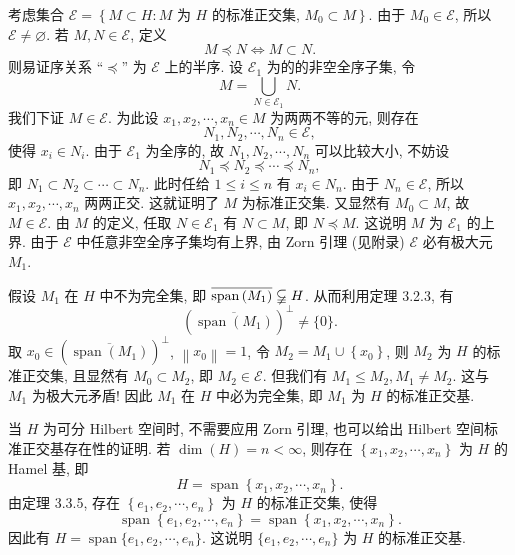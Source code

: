 \documentclass[openany]{ctexbook}
\makeatletter
\theoremstyle{kaiti}
\theoremstyle{normal}
\renewenvironment{proof}[1][\proofname]{\par
    \pushQED{\qed}%
    \normalfont \topsep6\p@\@plus6\p@\relax
    \trivlist
    \item\relax
    {\heiti #1}\hspace{2\labelsep}\ignorespaces
  }{%
    \popQED\endtrivlist\@endpefalse
  }
\makeatother
\begin{document}
\begin{proof}
考虑集合
$\mathcal{E}=\left\{M \subset H: M\right.$ 为 $H$ 的标准正交集, $\left.M_0 \subset M\right\}$.
由于 $M_0 \in \mathcal{E}$, 所以 $\mathcal{E} \neq \varnothing$.
若 $M, N \in \mathcal{E}$, 定义
$$
M \preccurlyeq N \Leftrightarrow M \subset N.
$$
则易证序关系 ``$\preccurlyeq$'' 为 $\mathcal{E}$ 上的半序. 设 $\mathcal{E}_1$ 为的的非空全序子集, 令
$$
M=\bigcup_{N \in \mathcal{E}_1} N.
$$
我们下证 $M \in \mathcal{E}$. 为此设 $x_1, x_2, \cdots, x_n \in M$ 为两两不等的元, 则存在
$$
N_1, N_2, \cdots, N_n \in \mathcal{E},
$$
使得 $x_{i} \in N_{i}$. 由于 $\mathcal{E}_1$ 为全序的, 故 $N_1, N_2, \cdots, N_n$ 可以比较大小, 不妨设
$$
N_1 \preccurlyeq N_2 \preccurlyeq \cdots \preccurlyeq N_n,
$$
即 $N_1 \subset N_2 \subset \cdots \subset N_n$. 此时任给 $1 \leqslant i \leqslant n$ 有 $x_{i} \in N_n$. 由于 $N_n \in \mathcal{E}$, 所以 $x_1, x_2, \cdots, x_n$ 两两正交. 这就证明了 $M$ 为标准正交集. 又显然有 $M_0 \subset M$, 故 $M \in \mathcal{E}$. 由 $M$ 的定义, 任取 $N \in \mathcal{E}_1$ 有 $N \subset M$, 即 $N \preccurlyeq M$. 这说明 $M$ 为 $\mathcal{E}_1$ 的上界. 由于 $\mathcal{E}$ 中任意非空全序子集均有上界, 由 Zorn 引理 (见附录) $\mathcal{E}$ 必有极大元 $M_1$.

假设 $M_1$ 在 $H$ 中不为完全集, 即 $\overline{\operatorname{span}\left(M_1\right)} \varsubsetneqq H$. 从而利用定理 3.2.3, 有
$$
\left(\overline{\operatorname{span}\left(M_1\right)}\right)^{\perp} \neq\{0\}.
$$
取 $x_0 \in\left(\overline{\operatorname{span}\left(M_1\right)}\right)^{\perp}$, $\left\|x_0\right\|=1$, 令 $M_2=M_1 \cup\left\{x_0\right\}$, 则 $M_2$ 为 $H$ 的标准正交集, 且显然有 $M_0 \subset M_2$, 即 $M_2 \in \mathcal{E}$. 但我们有 $M_1 \leqslant M_2, M_1 \neq M_2$. 这与 $M_1$ 为极大元矛盾! 因此 $M_1$ 在 $H$ 中必为完全集, 即 $M_1$ 为 $H$ 的标准正交基.
\end{proof}

当 $H$ 为可分 Hilbert 空间时, 不需要应用 Zorn 引理, 也可以给出 Hilbert 空间标准正交基存在性的证明. 若 $\operatorname{dim}(H)=n<\infty$, 则存在 $\left\{x_1, x_2, \cdots, x_n\right\}$ 为 $H$ 的 Hamel 基, 即
$$
H=\operatorname{span}\left\{x_1, x_2, \cdots, x_n\right\}.
$$
由定理 3.3.5, 存在 $\left\{e_1, e_2, \cdots, e_n\right\}$ 为 $H$ 的标准正交集, 使得
$$
\operatorname{span}\left\{e_1, e_2, \cdots, e_n\right\}=\operatorname{span}\left\{x_1, x_2, \cdots, x_n\right\}.
$$
因此有 $H=\operatorname{span}\{e_1, e_2, \cdots, e_n\}$. 这说明 $\{e_1, e_2, \cdots, e_n\}$ 为 $H$ 的标准正交基. 
\end{document}
